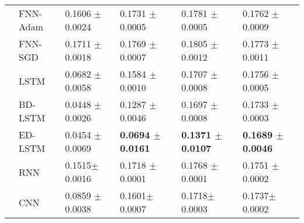 \documentclass{ieeeaccess}
\begin{document}
\begin{table*}[htbp!]
\begin{tabular}{llllll}
&FNN-Adam &  0.1606 $\pm$  0.0024     	&0.1731 $\pm$  0.0005         &	0.1781 $\pm$  0.0005        & 0.1762 $\pm$  0.0009\\

&FNN-SGD  & 0.1711 $\pm$   0.0018     	&  0.1769 $\pm$   0.0007      &0.1805 $\pm$   0.0012	       &0.1773 $\pm$   0.0011\\

&LSTM   & 0.0682 $\pm$   0.0058     	& 0.1584 $\pm$   0.0010       &	 0.1707 $\pm$   0.0008       & 0.1756 $\pm$   0.0005 \\

&BD-LSTM   & 0.0448 $\pm$  0.0026     	&  0.1287 $\pm$  0.0046        &0.1697 $\pm$  0.0008	       &0.1733 $\pm$  0.0003\\

&ED-LSTM   & 0.0454 $\pm$  0.0069     	& \textbf{0.0694 $\pm$  0.0161}        &	\textbf{0.1371 $\pm$  0.0107}        & \textbf{0.1689 $\pm$  0.0046}\\

&RNN  &    0.1515$\pm$ 0.0016    	& 0.1718 $\pm$  0.0001       &	 0.1768 $\pm$  0.0001       &0.1751 $\pm$  0.0002\\

&CNN & 0.0859	$\pm$ 0.0038     	& 	0.1601$\pm$ 	0.0007       &	0.1718$\pm$ 	0.0003       &0.1737$\pm$ 	0.0002\\
\hline

\end{tabular}
\end{table*}
\end{document}
